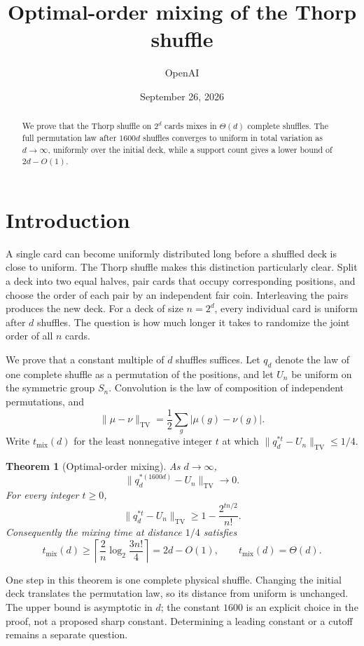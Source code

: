 \documentclass[11pt]{article}
\title{Optimal-order mixing of the Thorp shuffle}
\author{OpenAI}
\date{September 26, 2026}
\newtheorem{theorem}{Theorem}[section]
\theoremstyle{remark}
\numberwithin{equation}{section}
\begin{document}
\maketitle
\begin{abstract}
We prove that the Thorp shuffle on $2^d$ cards mixes in $\Theta(d)$ complete shuffles. The full permutation law after $1600d$ shuffles converges to uniform in total variation as $d\to\infty$, uniformly over the initial deck, while a support count gives a lower bound of $2d-O(1)$.
\end{abstract}

\section{Introduction}\label{sec:introduction}

A single card can become uniformly distributed long before a shuffled
deck is close to uniform. The Thorp shuffle makes this distinction
particularly clear. Split a deck into two equal halves, pair cards that
occupy corresponding positions, and choose the order of each pair by an
independent fair coin. Interleaving the pairs produces the new deck.
For a deck of size $n=2^d$, every individual card is uniform after $d$
shuffles. The question is how much longer it takes to randomize the
joint order of all $n$ cards.

We prove that a constant multiple of $d$ shuffles suffices. Let $q_d$
denote the law of one complete shuffle as a permutation of the
positions, and let $U_n$ be uniform on the symmetric group $S_n$.
Convolution is the law of composition of independent permutations, and
\[
 \|\mu-\nu\|_{\mathrm{TV}}
 =\frac12\sum_g|\mu(g)-\nu(g)|.
\]
Write $t_{\mathrm{mix}}(d)$ for the least nonnegative integer $t$ at which
$\|q_d^{*t}-U_n\|_{\mathrm{TV}}\le1/4$.

\begin{theorem}[Optimal-order mixing]\label{thm:mixing}
As $d\to\infty$,
\[
 \|q_d^{*(1600d)}-U_n\|_{\mathrm{TV}}\longrightarrow0.
\]
For every integer $t\ge0$,
\[
 \|q_d^{*t}-U_n\|_{\mathrm{TV}}
 \ge 1-\frac{2^{tn/2}}{n!}.
\]
Consequently the mixing time at distance $1/4$ satisfies
\[
 t_{\mathrm{mix}}(d)\ge
 \left\lceil\frac2n\log_2\frac{3n!}{4}\right\rceil
 =2d-O(1),
 \qquad t_{\mathrm{mix}}(d)=\Theta(d).
\]
\end{theorem}

One step in this theorem is one complete physical shuffle. Changing the
initial deck translates the permutation law, so its distance from
uniform is unchanged. The upper bound is asymptotic in $d$; the
constant $1600$ is an explicit choice in the proof, not a proposed
sharp constant. Determining a leading constant or a cutoff remains a
separate question.
\end{document}
